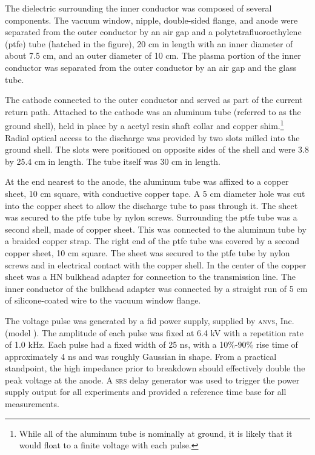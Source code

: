 The dielectric surrounding the inner conductor was composed of several
components. The vacuum window, nipple, double-sided flange, and anode were
separated from the outer conductor by an air gap and a polytetrafluoroethylene
(\acs{ptfe}) tube (hatched in the figure), 20 cm in length with an inner
diameter of about 7.5 cm, and an outer diameter of 10 cm. The plasma portion of
the inner conductor was separated from the outer conductor by an air gap and the
glass tube.

The cathode connected to the outer conductor and served as part of the current
return path. Attached to the cathode was an aluminum tube (referred to as the
ground shell), held in place by a acetyl resin shaft collar and copper
shim.\footnote{While all of the aluminum tube is nominally at ground, it is
likely that it would float to a finite voltage with each pulse.} Radial optical
access to the discharge was provided by two slots milled into the ground shell.
The slots were positioned on opposite sides of the shell and were 3.8 by 25.4 cm
in length. The tube itself was 30 cm in length.

At the end nearest to the anode, the aluminum tube was affixed to a copper
sheet, 10 cm square, with conductive copper tape. A 5 cm diameter hole was cut
into the copper sheet to allow the discharge tube to pass through it. The sheet
was secured to the \acs{ptfe} tube by nylon screws. Surrounding the \acs{ptfe}
tube was a second shell, made of copper sheet. This was connected to the
aluminum tube by a braided copper strap. The right end of the \acs{ptfe} tube
was covered by a second copper sheet, 10 cm square. The sheet was secured to the
\acs{ptfe} tube by nylon screws and in electrical contact with the copper shell.
In the center of the copper sheet was a HN bulkhead adapter for connection to
the transmission line. The inner conductor of the bulkhead adapter was connected
by a straight run of 5 cm of silicone-coated wire to the vacuum window flange.

The voltage pulse was generated by a \acs{fid} power supply, supplied by
\textsc{anvs}, Inc. (model ). The amplitude of each pulse was
fixed at 6.4 kV with a repetition rate of 1.0 kHz. Each pulse had a fixed width
of 25 ns, with a 10\%-90\% rise time of approximately 4 ns and was roughly
Gaussian in shape. From a practical standpoint, the high impedance prior to
breakdown should effectively double the peak voltage at the anode. A
\textsc{srs}  delay generator was used to trigger the power
supply output for all experiments and provided a reference time base for all
measurements.

